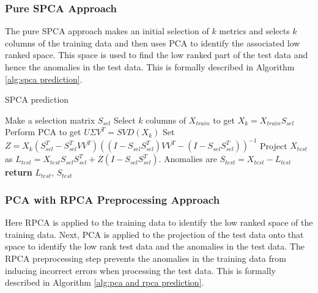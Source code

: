 \documentclass[conference]{IEEEtran}
\begin{document}
\subsubsection{Pure SPCA Approach}
The pure SPCA approach makes an initial selection of $k$ metrics and selects $k$ columns of the training data and then uses PCA to identify the associated low ranked space.  This space is used to find the low ranked part of the test data and hence the anomalies in the test data. This is formally described in Algorithm \ref{alg:spca prediction}.
\begin{algorithm}
\caption{SPCA prediction}\label{alg:spca prediction}
\begin{algorithmic}[1]
\State Make a selection matrix $S_{sel}$
\State Select $k$ columns of $X_{train}$ to get $X_k = X_{train} S_{sel}$
\State Perform PCA to get $U \Sigma V^T = SVD(X_k)$
\State Set $Z = X_k (S_{sel}^T - S_{sel}^T V V^T)  ((I-S_{sel} S_{sel}^T)V V^T - (I-S_{sel} S_{sel}^T))^{-1}$
\State Project $X_{test}$ as $L_{test} = X_{test} S_{sel} S_{sel}^T + Z (I-S_{sel} S_{sel}^T)$.
\State Anomalies are $S_{test} = X_{test} - L_{test}$
\State \textbf{return} $L_{test}$, $S_{test}$
\EndProcedure
\end{algorithmic}
\end{algorithm}

\subsubsection{PCA with RPCA Preprocessing Approach}
Here RPCA is applied to the training data to identify the low ranked space of the training data.  Next, PCA is applied to the projection of the test data onto that space to identify the low rank test data and the anomalies in the test data.  The RPCA preprocessing step prevents the anomalies in the training data from inducing incorrect errors when processing the test data.  This is formally described in Algorithm \ref{alg:pca and rpca prediction}.
\end{document}
